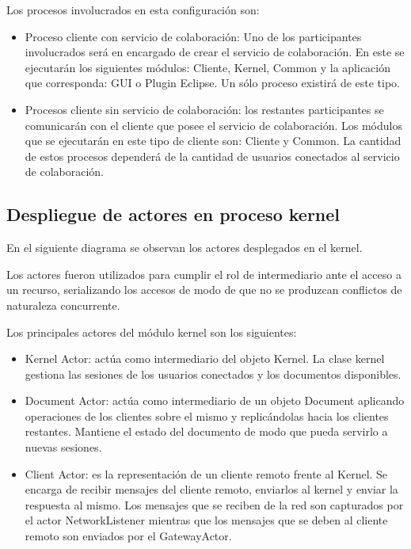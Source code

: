 \documentclass[12pt,a4paper]{article}
\begin{document}
Los procesos involucrados en esta configuración son:
\begin{itemize}
	\item Proceso cliente con servicio de colaboración: Uno de los participantes involucrados será en encargado de crear el
	servicio de colaboración. En este se ejecutarán los siguientes módulos: Cliente, Kernel, Common y la aplicación que
	corresponda: GUI o Plugin Eclipse. Un sólo proceso existirá de este tipo.
	\item Procesos cliente sin servicio de colaboración: los restantes participantes se comunicarán con el cliente que posee
	el servicio de colaboración. Los módulos que se ejecutarán en este tipo de cliente son: Cliente y Common. La cantidad de
	estos procesos dependerá de la cantidad de usuarios conectados al servicio de colaboración.
\end{itemize}

\subsection{Despliegue de actores en proceso kernel}

En el siguiente diagrama se observan los actores desplegados en el kernel.


Los actores fueron utilizados para cumplir el rol de intermediario ante el acceso a un recurso, serializando los accesos de
modo de que no se produzcan conflictos de naturaleza concurrente.

Los principales actores del módulo kernel son los siguientes:
\begin{itemize}
	\item Kernel Actor: actúa como intermediario del objeto Kernel. La clase kernel gestiona las sesiones de los usuarios
	conectados y los documentos disponibles.
	\item Document Actor: actúa como intermediario de un objeto Document aplicando operaciones de los clientes sobre el mismo
	y replicándolas hacia los clientes restantes. Mantiene el estado del documento de modo que pueda servirlo a nuevas sesiones.
	\item Client Actor: es la representación de un cliente remoto frente al Kernel. Se encarga de recibir mensajes del
	cliente remoto, enviarlos al kernel y enviar la respuesta al mismo. Los mensajes que se reciben de la red son capturados por
	el actor NetworkListener mientras que los mensajes que se deben al cliente remoto son enviados por el GatewayActor.
\end{itemize}
\end{document}
